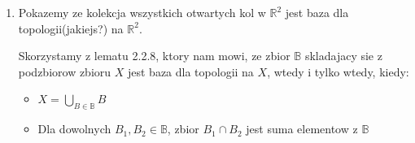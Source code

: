 \documentclass{article}
\begin{document}
\begin{enumerate}[align=left]
\begin{enumerate}
                Pokazemy to w sposob podobny do tego w ktorym pokazywalismy ze kolo $D = \left\{ \langle x,y \rangle: x^{2} + y^{2} < 1 \right\}$ jest zbiorem otwartym. Mianowicie niech $$B_{a,b,c} = \left\{ \langle x,y \rangle: (x-a)^{2} + (y-b)^{2} = c^{2}, a,b,c \in \mathbb{R} \right\}$$ bedzie kolem o srodku w $\langle a, b\rangle$ i promieniu $c^{2}$.

Nastepnie dla danego kola $B_{a,b,c}$ i punktu $\langle p, q\rangle \in B_{a,b,c}$ zdefiniujmy sobie $r = \sqrt{(p-a)^{2} + (q-b)^2}$ oraz otwarty prostokat $$R =  \left\{\langle x,y \rangle: p - \frac{c^{2} - r}{2} < x < p + \frac{c^{2}-r}{2} \land q - \frac{c^{2}-r}{2} < y < q + \frac{c^{2}-r}{2} \right\}$$

Ustalmy dowolny punkt $\langle p, q\rangle \in B_{a,b,c}$.
           \begin{enumerate}[label=(\roman*)]
               \item Pokaze, ze $R \subset B_{a,b,c}$.

                   Ustalmy dowolny punkt $\langle x,y \rangle \in R$. Z definicji $R$, nasz punkt $\langle x,y \rangle$ spelnia ponizsze nierownosci:
                   \begin{itemize}
                       \item $p -\frac{c^{2} - r}{2} < x < p +  \frac{c^{2} - r}{2}$
                       \item $q - \frac{c^{2} - r}{2} < y < q +  \frac{c^{2} - r}{2}$
                   \end{itemize}

                   Pokazemy, ze $\langle x, y \rangle$ spelnia tez nierownosc: $(a - x)^{2} + (b - y)^{2} < c^{2}$, czyli ze $\langle x,y \rangle \in B_{a,b,c}$
               
           \end{enumerate}
       \item Pokazemy ze kolekcja wszystkich otwartych kol w $\mathbb{R}^{2}$ jest baza dla topologii(jakiejs?) na $\mathbb{R}^{2}$.

           Skorzystamy z lematu 2.2.8, ktory nam mowi, ze zbior $\mathbb{B}$ skladajacy sie z podzbiorow zbioru $X$ jest baza dla topologii na $X$, wtedy i tylko wtedy, kiedy:

           \begin{itemize}
               \item $X = \bigcup\limits_{B \in \mathbb{B}}B$
               \item Dla dowolnych $B_{1}, B_{2} \in \mathbb{B}$, zbior $B_{1} \cap B_{2}$ jest suma elementow z $\mathbb{B}$
               

\end{itemize}
\end{enumerate}
\end{enumerate}
\end{document}

